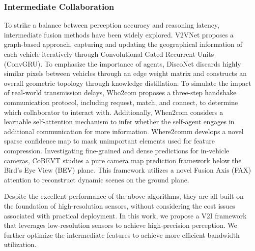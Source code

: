 \subsubsection{Intermediate Collaboration}
To strike a balance between perception accuracy and reasoning latency, intermediate fusion methods have been widely explored. V2VNet proposes a graph-based approach, capturing and updating the geographical information of each vehicle iteratively through Convolutional Gated Recurrent Units (ConvGRU). To emphasize the importance of agents, DiscoNet discards highly similar pixels between vehicles through an edge weight matrix and constructs an overall geometric topology through knowledge distillation. To simulate the impact of real-world transmission delays, Who2com \cite{9197364} proposes a three-step handshake communication protocol, including request, match, and connect, to determine which collaborator to interact with. Additionally, When2com \cite{Liu_2020_CVPR} considers a learnable self-attention mechanism to infer whether the self-agent engages in additional communication for more information. Where2comm develops a novel sparse confidence map to mask unimportant elements used for feature compression. Investigating fine-grained and dense predictions for in-vehicle cameras, CoBEVT \cite{pmlr-v205-xu23a} studies a pure camera map prediction framework below the Bird's Eye View (BEV) plane. This framework utilizes a novel Fusion Axis (FAX) attention to reconstruct dynamic scenes on the ground plane.

Despite the excellent performance of the above algorithms, they are all built on the foundation of high-resolution sensors, without considering the cost issues associated with practical deployment. In this work, we propose a V2I framework that leverages low-resolution sensors to achieve high-precision perception. We further optimize the intermediate features to achieve more efficient bandwidth utilization.



